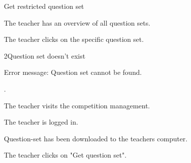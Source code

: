 \begin{uc}{Get restricted question set}


    \begin{uc-mss}
    \item The teacher has an overview of all question sets.
    \item The teacher clicks on the specific question set.
    \end{uc-mss}

    \begin{uc-ext}

        \begin{uc-fail}{2}{Question set doesn't exist}
        \item Error message: Question set cannot be found.
        \item {}.
        \end{uc-fail}

    \end{uc-ext}

    \begin{uc-pre}
    \item The teacher visits the competition management.
        \item The teacher is logged in.
    \end{uc-pre}

    \begin{uc-post}
    \item Question-set has been downloaded to the teachers computer.
    \end{uc-post}

    \begin{uc-trig}
        The teacher clicks on "Get question set".
    \end{uc-trig}

\end{uc}
